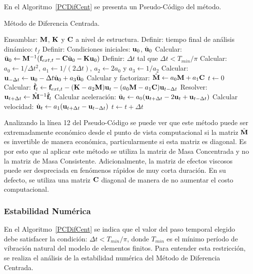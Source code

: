 En el Algoritmo~\ref{PCDifCent} se presenta un Pseudo-Código del método.

\begin{algorithm}[htb]
\caption{Método de Diferencia Centrada.} \label{PCDifCent}
	\begin{algorithmic}[1]
	\STATE Ensamblar: ${\bf M}$, ${\bf K}$ y ${\bf C}$ a nivel de estructura.
	\STATE Definir: tiempo final de análisis dinámico: $t_f$
	\STATE Definir: Condiciones iniciales: ${\bf u}_{0}$, $\dot{{\bf u}}_{0}$
	\STATE Calcular: $\ddot{{\bf u}}_{0}\leftarrow {\bf M}^{-1}({\bf f}_{ext,t} - {\bf C} \dot{{\bf u}}_0 - {\bf K} {\bf u}_0)$
	\STATE Definir: $\Delta t$ tal que $\Delta t < T_{min} / \pi$
	\STATE Calcular: $a_0\leftarrow1/\Delta t^2$, $a_1\leftarrow1/(2\Delta t)$, $a_2\leftarrow2a_0$ y $a_3\leftarrow1/a_2$
	\STATE Calcular: ${\bf u}_{-\Delta t} \leftarrow {\bf u}_0 - \Delta t \dot{{\bf u}}_0 + a_3\ddot{{\bf u}}_0$
	\STATE Calcular y factorizar: $\hat{{\bf M}}\leftarrow a_0{\bf M}+a_1{\bf C}$
	\STATE $t \leftarrow 0$
		\STATE Calcular: $\hat{{\bf f}}_t\leftarrow {\bf f}_{ext,t} - ({\bf K}-a_2{\bf M}){\bf u}_t - (a_0{\bf M}-a_1{\bf C}){\bf u}_{t-\Delta t}$
		\STATE Resolver: ${\bf u}_{t+\Delta t}\leftarrow \hat{{\bf M}}^{-1}\hat{{\bf f}}_t$
		\STATE Calcular aceleración: $\ddot{{\bf u}}_{t}\leftarrow a_0({\bf u}_{t+\Delta t}-2{\bf u}_{t}+{\bf u}_{t-\Delta t})$
		\STATE Calcular velocidad: $\dot{{\bf u}}_{t}\leftarrow a_1({\bf u}_{t+\Delta t}-{\bf u}_{t-\Delta t})$
		\STATE $t\leftarrow t+\Delta t$
	\ENDWHILE	
\end{algorithmic}
\end{algorithm}

Analizando la línea 12 del Pseudo-Código se puede ver que este método puede ser extremadamente económico desde el punto de vista computacional si la matriz $\hat{{\bf M}}$ es invertible de manera económica, particularmente si esta matriz es diagonal. %
%
Es por esto que al aplicar este método se utiliza la matriz de Masa Concentrada y no la matriz de Masa Consistente. %
%
Adicionalmente, la matriz de efectos viscosos puede ser despreciada en fenómenos rápidos de muy corta duración. %
%
En su defecto, se utiliza una matriz ${\bf C}$ diagonal de manera de no aumentar el costo computacional.


\subsubsection{Estabilidad Numérica}\label{DifCenStab}

En el Algoritmo~\ref{PCDifCent} se indica que el valor del paso temporal elegido debe satisfacer la condición: $\Delta t < T_{min}/\pi$, donde $T_{min}$ es el mínimo período de vibración natural del modelo de elementos finitos. Para entender esta restricción, se realiza el análisis de la estabilidad numérica del Método de Diferencia Centrada.

